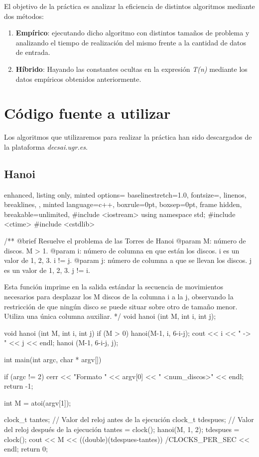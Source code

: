 \documentclass[12pt,spanish]{article}
\begin{document}
El objetivo de la práctica es analizar la eficiencia de distintos algoritmos mediante dos métodos:
\begin{enumerate}
\item \textbf{Empírico}: ejecutando dicho algoritmo con distintos tamaños de problema y analizando el tiempo de realización del mismo frente a la cantidad de datos de entrada.
\item \textbf{Híbrido}: Hayando las constantes ocultas en la expresión \textit{T(n)} mediante los datos empíricos obtenidos anteriormente.
\end{enumerate}
\section{Código fuente a utilizar}

Los algoritmos que utilizaremos para realizar la práctica han sido descargados de la plataforma \textit{decsai.ugr.es}.

\subsection{Hanoi}
\begin{multicols}{2}
\begin{tcblisting}{
  enhanced,
  listing only,
  minted options={
    baselinestretch=1.0,
    fontsize=\footnotesize,
    linenos,
    breaklines,
  },
  minted language=c++,
  boxrule=0pt,
  boxsep=0pt,
  frame hidden,
  breakable=unlimited,
}  
#include <iostream>
using namespace std;
#include <ctime>
#include <cstdlib>

/**
   @brief Resuelve el problema de las Torres de Hanoi
   @param M: número de discos. M > 1.
   @param i: número de columna en que están los discos.
             i es un valor de {1, 2, 3}. i != j.
   @param j: número de columna a que se llevan los discos.
             j es un valor de {1, 2, 3}. j != i.

   Esta función imprime en la salida estándar la secuencia de 
   movimientos necesarios para desplazar los M discos de la
   columna i a la j, observando la restricción de que ningún
   disco se puede situar sobre otro de tamaño menor. Utiliza
   una única columna auxiliar.
*/
void hanoi (int M, int i, int j);

void hanoi (int M, int i, int j)
{
  if (M > 0)
    {
      hanoi(M-1, i, 6-i-j);
      cout << i << " -> " << j << endl;
      hanoi (M-1, 6-i-j, j);
  }
}

int main(int argc, char * argv[])
{
  
    if (argc != 2)
    {
      cerr << "Formato " << argv[0] << " <num_discos>" << endl;
      return -1;
    }

  int M = atoi(argv[1]);

  clock_t tantes;    // Valor del reloj antes de la ejecución
  clock_t tdespues;  // Valor del reloj después de la ejecución
  tantes = clock();
  hanoi(M, 1, 2);
  tdespues = clock();
  cout << M << 
  ((double)(tdespues-tantes))
  /CLOCKS_PER_SEC << endl; 
  return 0;
}
\end{tcblisting}
\end{multicols}
\newpage
\end{document}
